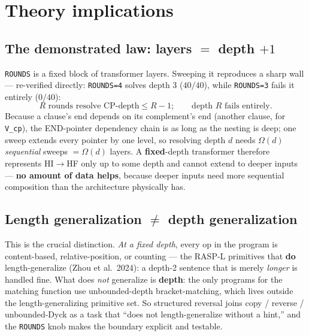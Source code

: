 \documentclass[11pt]{article}
\newcommand{\code}[1]{\texttt{#1}}
\begin{document}
\section{Theory implications}

\subsection{The demonstrated law: layers $=$ depth $+1$}
\texttt{ROUNDS} is a fixed block of transformer layers. Sweeping it reproduces a sharp wall ---
re-verified directly: \code{ROUNDS=4} solves depth 3 ($40/40$), while \code{ROUNDS=3} fails it
entirely ($0/40$):
\[
  R \text{ rounds resolve CP-depth} \le R-1; \qquad \text{depth } R \text{ fails entirely.}
\]
Because a clause's end depends on its complement's end (another clause, for \code{V\_cp}), the
END-pointer dependency chain is as long as the nesting is deep; one sweep extends every pointer by
one level, so resolving depth $d$ needs $\Omega(d)$ \emph{sequential} sweeps $=\Omega(d)$ layers.
A \textbf{fixed}-depth transformer therefore represents HI$\to$HF only up to some depth and cannot
extend to deeper inputs --- \textbf{no amount of data helps}, because deeper inputs need more
sequential composition than the architecture physically has.

\subsection{Length generalization $\ne$ depth generalization}
This is the crucial distinction. \emph{At a fixed depth}, every op in the program is content-based,
relative-position, or counting --- the RASP-L primitives that \textbf{do} length-generalize (Zhou
et al.\ 2024): a depth-2 sentence that is merely \emph{longer} is handled fine. What does
\emph{not} generalize is \textbf{depth}: the only programs for the matching function use
unbounded-depth bracket-matching, which lives outside the length-generalizing primitive set. So
structured reversal joins copy / reverse / unbounded-Dyck as a task that ``does not
length-generalize without a hint,'' and the \code{ROUNDS} knob makes the boundary explicit and
testable.
\end{document}
